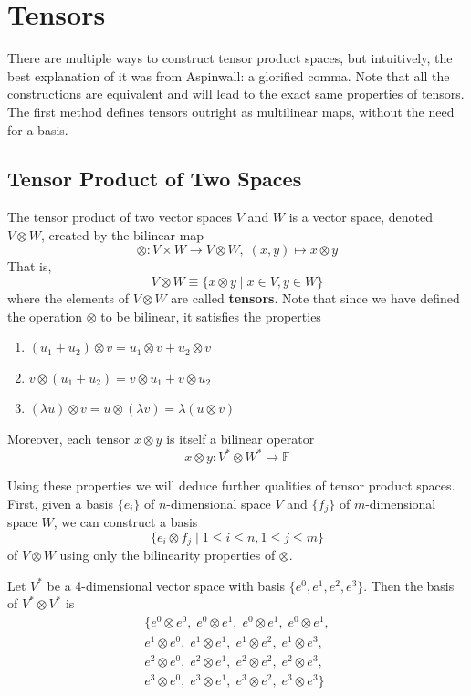 \section{Tensors}

  There are multiple ways to construct tensor product spaces, but intuitively, the best explanation of it was from Aspinwall: a glorified comma. Note that all the constructions are equivalent and will lead to the exact same properties of tensors. The first method defines tensors outright as multilinear maps, without the need for a basis. 

\subsection{Tensor Product of Two Spaces}

  \begin{definition}
    The tensor product of two vector spaces $V$ and $W$ is a vector space, denoted $V \otimes W$, created by the bilinear map 
    \[\otimes: V \times W \longrightarrow V \otimes W, \; (x, y) \mapsto x \otimes y\]
    That is, 
    \[V \otimes W \equiv \{ x \otimes y \; | \; x \in V, y \in W\} \]
    where the elements of $V \otimes W$ are called \textbf{tensors}. Note that since we have defined the operation $\otimes$ to be bilinear, it satisfies the properties
    \begin{enumerate}
        \item $(u_1 + u_2) \otimes v = u_1 \otimes v + u_2 \otimes v$
        \item $v \otimes (u_1 + u_2) = v \otimes u_1 + v \otimes u_2$
        \item $(\lambda u) \otimes v = u \otimes (\lambda v) = \lambda (u \otimes v)$ 
    \end{enumerate}
    Moreover, each tensor $x \otimes y$ is itself a bilinear operator
    \[x \otimes y: V^* \otimes W^* \longrightarrow \mathbb{F}\]
  \end{definition}

  Using these properties we will deduce further qualities of tensor product spaces. First, given a basis $\{e_i\}$ of $n$-dimensional space $V$ and $\{f_j\}$ of $m$-dimensional space $W$, we can construct a basis 
  \[\{e_i \otimes f_j \; | \; 1 \leq i \leq n, 1 \leq j \leq m\}\]
  of $V \otimes W$ using only the bilinearity properties of $\otimes$. 

  \begin{example}
    Let $V^*$ be a 4-dimensional vector space with basis $\{ e^0, e^1, e^2, e^3\}$. Then the basis of $V^* \otimes V^*$ is
    \begin{align*} 
    \{e^0 \otimes e^0, \; e^0 \otimes e^1, \;e^0 \otimes e^1, \;e^0 \otimes e^1, \\
    e^1 \otimes e^0,\; e^1 \otimes e^1,\; e^1 \otimes e^2,\; e^1 \otimes e^3, \\
    e^2 \otimes e^0,\; e^2 \otimes e^1,\; e^2 \otimes e^2,\; e^2 \otimes e^3, \\
    e^3 \otimes e^0,\; e^3 \otimes e^1,\; e^3 \otimes e^2,\; e^3 \otimes e^3\}
    \end{align*}
  \end{example}

